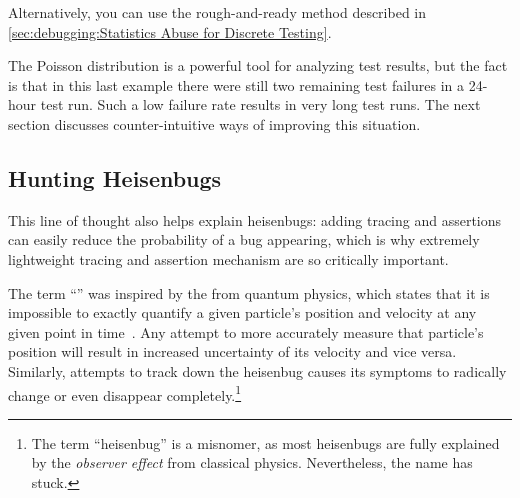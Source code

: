 {{	Alternatively, you can use the rough-and-ready method described in
	\cref{sec:debugging:Statistics Abuse for Discrete Testing}.
}\QuickQuizEndB
%
\QuickQuizEndE
}

The Poisson distribution is a powerful tool for analyzing test results,
but the fact is that in this last example there were still two remaining
test failures in a 24-hour test run.
Such a low failure rate results in very long test runs.
The next section discusses counter-intuitive ways of improving this situation.

\subsection{Hunting Heisenbugs}
\label{sec:debugging:Hunting Heisenbugs}

This line of thought also helps explain heisenbugs:
adding tracing and assertions can easily reduce the probability
of a bug appearing, which
is why extremely lightweight tracing and assertion mechanism are
so critically important.

The term ``'' was inspired by the 
 from quantum physics, which states that
it is impossible to
exactly quantify a given particle's position and velocity at any given
point in time~\cite{WeinerHeisenberg1927Uncertain}.
Any attempt to more accurately measure that particle's position will
result in increased uncertainty of its velocity and vice versa.
Similarly, attempts to track down
the heisenbug causes its symptoms to radically change or even disappear
completely.\footnote{
	The term ``heisenbug'' is a misnomer, as most heisenbugs are
	fully explained by the \emph{observer effect} from classical
	physics.
	Nevertheless, the name has stuck.}


